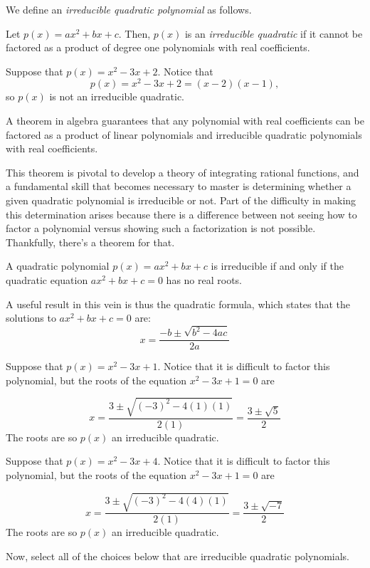 \documentclass{ximera}
\author{Jim Talamo}
\begin{document}
\begin{exercise}
We define an \emph{irreducible quadratic polynomial} as follows.

Let $p(x) = ax^2+bx+c$.  Then, $p(x)$ is an \emph{irreducible quadratic} if it cannot be factored as a product of degree one polynomials with real coefficients.

\begin{example}
Suppose that $p(x) = x^2-3x+2$.  Notice that \[p(x) = x^2-3x+2 = (x-2)(x-1),\] so $p(x)$ is not an irreducible quadratic.
\end{example}

A theorem in algebra guarantees that any polynomial with real coefficients can be factored as a product of linear polynomials and irreducible quadratic polynomials with real coefficients.  

This theorem is pivotal to develop a theory of integrating rational functions, and a fundamental skill that becomes necessary to master is determining whether a given quadratic polynomial is irreducible or not.  Part of the difficulty in making this determination arises because there is a difference between not seeing how to factor a polynomial versus showing such a factorization is not possible.  Thankfully, there's a theorem for that.

\begin{theorem}
A quadratic polynomial $p(x) = ax^2+bx+c$ is irreducible if and only if the quadratic equation $ax^2+bx+c =0$ has no real roots.
\end{theorem}

A useful result in this vein is thus the quadratic formula, which states that the solutions to $ax^2+bx+c=0$ are:
\[
x = \frac{-b\pm\sqrt{b^2-4ac}}{2a}
\]

\begin{example}
Suppose that $p(x) = x^2-3x+1$.  Notice that it is difficult to factor this polynomial, but the roots of the equation $x^2-3x+1 = 0$ are

\[
x = \frac{3\pm\sqrt{(-3)^2-4(1)(1)}}{2(1)}=\frac{3 \pm \sqrt{5}}{2}
\]
The roots are so $p(x)$  an irreducible quadratic.
\end{example}

\begin{example}
Suppose that $p(x) = x^2-3x+4$.  Notice that it is difficult to factor this polynomial, but the roots of the equation $x^2-3x+1 = 0$ are

\[
x = \frac{3\pm\sqrt{(-3)^2-4(4)(1)}}{2(1)}=\frac{3 \pm \sqrt{-7}}{2}
\]
The roots are so $p(x)$  an irreducible quadratic.
\end{example}

Now, select all of the choices below that are irreducible quadratic polynomials.
\begin{selectAll}
\end{selectAll}
\end{exercise}
\end{document}

